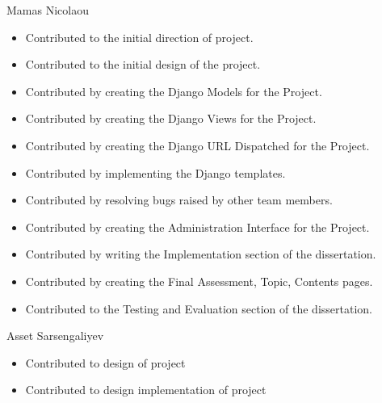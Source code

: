 Mamas Nicolaou
\begin{itemize}
\item Contributed to the initial direction of project.
\item Contributed to the initial design of the project.
\item Contributed by creating the Django Models for the Project.
\item Contributed by creating the Django Views for the Project.
\item Contributed by creating the Django URL Dispatched for the Project.
\item Contributed by implementing the Django templates.
\item Contributed by resolving bugs raised by other team members.
\item Contributed by creating the Administration Interface for the Project.
\item Contributed by writing the Implementation section of the dissertation.
\item Contributed by creating the Final Assessment, Topic, Contents pages.
\item Contributed to the Testing and Evaluation section of the dissertation.
\end{itemize}

Asset Sarsengaliyev
\begin{itemize}
\item Contributed to design of project
\item Contributed to design implementation of project

\end{itemize}
